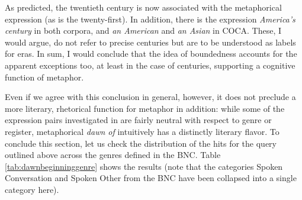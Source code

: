 \begin{table}[!htbp]
\caption{Differential collexemes of \textit{dawn/beginning of \_\_ century} (COHA)}
\label{tab:dawnofdifferentialcoha}
\end{table}

As predicted, the twentieth century is now associated with the metaphorical expression (as is the twenty-first). In addition, there is the expression \textit{America's century} in both corpora, and \textit{an American} and \textit{an Asian} in COCA. These, I would argue, do not refer to precise centuries but are to be understood as labels for eras. In sum, I would conclude that the idea of boundedness accounts for the apparent exceptions too, at least in the case of centuries, supporting a cognitive function of metaphor.

Even if we agree with this conclusion in general, however, it does not preclude a more literary, rhetorical function for metaphor in addition: while some of the expression pairs investigated in \citet{stefanowitsch_function_2005} are fairly neutral with respect to genre or register, metaphorical \textit{dawn of} intuitively has a distinctly literary flavor. To conclude this section, let us check the distribution of the hits for the query outlined above across the genres defined in the BNC. Table \ref{tab:dawnbeginninggenre} shows the results (note that the categories Spoken Conversation and Spoken Other from the BNC have been collapsed into a single category here).

